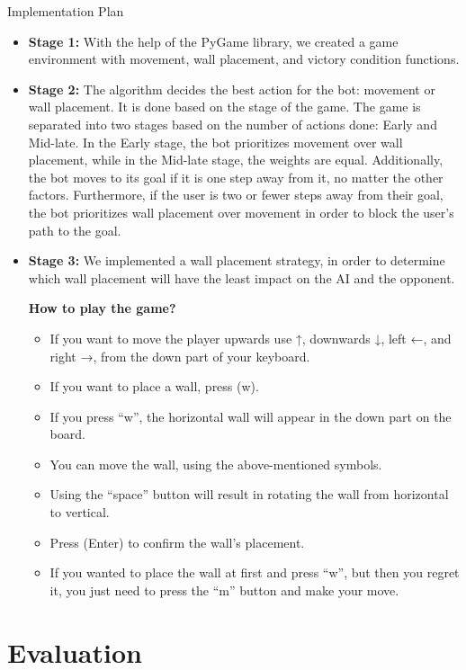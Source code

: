 \documentclass[12pt]{report}
\begin{document}
Implementation Plan
\begin{itemize}
    \item \textbf{Stage 1:} With the help of the PyGame library, we created a game environment with movement, wall placement, and victory condition functions.
    \item \textbf{Stage 2:} The algorithm decides the best action for the bot: movement or wall placement. It is done based on the stage of the game. The game is separated into two stages based on the number of actions done: Early and Mid-late. In the Early stage, the bot prioritizes movement over wall placement, while in the Mid-late stage, the weights are equal. Additionally, the bot moves to its goal if it is one step away from it, no matter the other factors. Furthermore, if the user is two or fewer steps away from their goal, the bot prioritizes wall placement over movement in order to block the user’s path to the goal.
    \item \textbf{Stage 3:} We implemented a wall placement strategy, in order to determine which wall placement will have the least impact on the AI and the opponent.
   

\textbf{How to play the game?}
\begin{itemize}
  \item If you want to move the player upwards use ↑, downwards ↓, left ←, and right →, from the down part of your keyboard.
  \item If you want to place a wall, press (w).
  \item If you press “w”, the horizontal wall will appear in the down part on the board.
  \item You can move the wall, using the above-mentioned symbols.
  \item Using the “space” button will result in rotating the wall from horizontal to vertical.
  \item Press (Enter) to confirm the wall's placement.
  \item If you wanted to place the wall at first and press “w”, but then you regret it, you just need to press the “m” button and make your move.
\end{itemize}
 


\end{itemize}

\newpage

\chapter{Evaluation}
\end{document}
